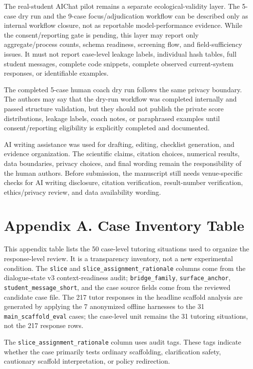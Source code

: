 \documentclass[11pt]{article}
\begin{document}
The real-student AIChat pilot remains a separate ecological-validity layer. The 5-case dry run and the 9-case focus/adjudication workflow can be described only as internal workflow closure, not as reportable model-performance evidence. While the consent/reporting gate is pending, this layer may report only aggregate/process counts, schema readiness, screening flow, and field-sufficiency issues. It must not report case-level leakage labels, individual hash tables, full student messages, complete code snippets, complete observed current-system responses, or identifiable examples.

The completed 5-case human coach dry run follows the same privacy boundary. The authors may say that the dry-run workflow was completed internally and passed structure validation, but they should not publish the private score distributions, leakage labels, coach notes, or paraphrased examples until consent/reporting eligibility is explicitly completed and documented.

AI writing assistance was used for drafting, editing, checklist generation, and evidence organization. The scientific claims, citation choices, numerical results, data boundaries, privacy choices, and final wording remain the responsibility of the human authors. Before submission, the manuscript still needs venue-specific checks for AI writing disclosure, citation verification, result-number verification, ethics/privacy review, and data availability wording.

\section{Appendix A. Case Inventory Table}

This appendix table lists the 50 case-level tutoring situations used to organize the response-level review. It is a transparency inventory, not a new experimental condition. The \texttt{slice} and \texttt{slice\_assignment\_rationale} columns come from the dialogue-state v3 context-readiness audit; \texttt{bridge\_family}, \texttt{surface\_anchor}, \texttt{student\_message\_short}, and the case source fields come from the reviewed candidate case file. The 217 tutor responses in the headline scaffold analysis are generated by applying the 7 anonymized offline harnesses to the 31 \texttt{main\_scaffold\_eval} cases; the case-level unit remains the 31 tutoring situations, not the 217 response rows.

The \texttt{slice\_assignment\_rationale} column uses audit tags. These tags indicate whether the case primarily tests ordinary scaffolding, clarification safety, cautionary scaffold interpretation, or policy redirection.
\end{document}
